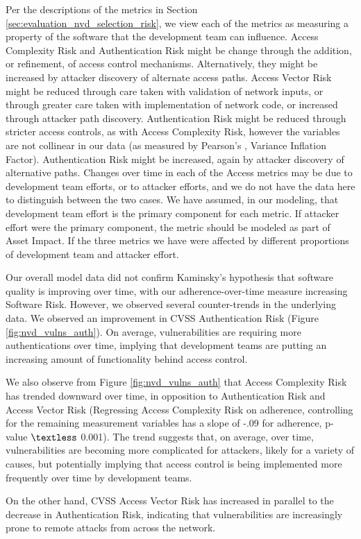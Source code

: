 Per the descriptions of the metrics in Section \ref{sec:evaluation_nvd_selection_risk}, we view each of the metrics as measuring a property of the software that the development team can influence. Access Complexity Risk and Authentication Risk might be change through the addition, or refinement, of access control mechanisms. Alternatively, they might be increased by attacker discovery of alternate access paths.   Access Vector Risk might be reduced through care taken with validation of network inputs, or through greater care taken with implementation of network code, or increased through attacker path discovery. Authentication Risk might be reduced through stricter access controls, as with Access Complexity Risk, however the variables are not collinear in our data (as measured by Pearson's , Variance Inflation Factor). Authentication Risk might be increased, again by attacker discovery of alternative paths. Changes over time in each of the Access metrics may be due to development team efforts, or to attacker efforts, and we do not have the data here to distinguish between the two cases. We have assumed, in our modeling, that development team effort is the primary component for each metric. If attacker effort were the primary component, the metric should be modeled as part of Asset Impact.  If the three metrics we have were affected by different proportions of development team and attacker effort.

Our overall model data did not confirm Kaminsky's hypothesis that software quality is improving over time, with our adherence-over-time measure increasing Software Risk. However, we observed several counter-trends in the underlying data. We observed an improvement in CVSS Authentication Risk (Figure \ref{fig:nvd_vulns_auth}). On average, vulnerabilities are requiring more authentications over time, implying that development teams are putting an increasing amount of functionality behind access control.

We also observe from Figure \ref{fig:nvd_vulns_auth} that Access Complexity Risk has trended downward over time, in opposition to Authentication Risk and Access Vector Risk (Regressing Access Complexity Risk on adherence, controlling for the remaining measurement variables has a slope of -.09 for adherence, p-value $\textless$ 0.001). The trend suggests that, on average, over time, vulnerabilities are becoming more complicated for attackers, likely for a variety of causes, but potentially implying that access control is being implemented more frequently over time by development teams.

On the other hand, CVSS Access Vector Risk has increased in parallel to the decrease in Authentication Risk, indicating that vulnerabilities are increasingly prone to remote attacks from across the network.